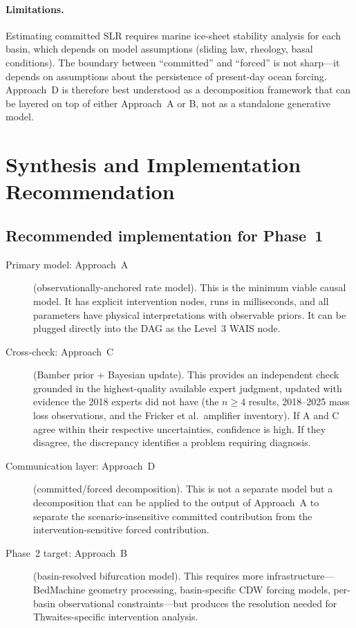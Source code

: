 \documentclass[11pt]{article}
\begin{document}
\paragraph{Limitations.}  Estimating committed SLR requires marine ice-sheet stability analysis for each basin, which depends on model assumptions (sliding law, rheology, basal conditions).  The boundary between ``committed'' and ``forced'' is not sharp---it depends on assumptions about the persistence of present-day ocean forcing.  Approach~D is therefore best understood as a decomposition framework that can be layered on top of either Approach~A or B, not as a standalone generative model.


\section{Synthesis and Implementation Recommendation}
\label{sec:synthesis}

\subsection{Recommended implementation for Phase~1}

\begin{description}
  \item[Primary model: Approach~A] (observationally-anchored rate model).  This is the minimum viable causal model.  It has explicit intervention nodes, runs in milliseconds, and all parameters have physical interpretations with observable priors.  It can be plugged directly into the DAG as the Level~3 WAIS node.

  \item[Cross-check: Approach~C] (Bamber prior + Bayesian update).  This provides an independent check grounded in the highest-quality available expert judgment, updated with evidence the 2018 experts did not have (the $n \geq 4$ results, 2018--2025 mass loss observations, and the Fricker et al.\ amplifier inventory).  If A and C agree within their respective uncertainties, confidence is high.  If they disagree, the discrepancy identifies a problem requiring diagnosis.

  \item[Communication layer: Approach~D] (committed/forced decomposition).  This is not a separate model but a decomposition that can be applied to the output of Approach~A to separate the scenario-insensitive committed contribution from the intervention-sensitive forced contribution.

  \item[Phase~2 target: Approach~B] (basin-resolved bifurcation model).  This requires more infrastructure---BedMachine geometry processing, basin-specific CDW forcing models, per-basin observational constraints---but produces the resolution needed for Thwaites-specific intervention analysis.
\end{description}
\end{document}
